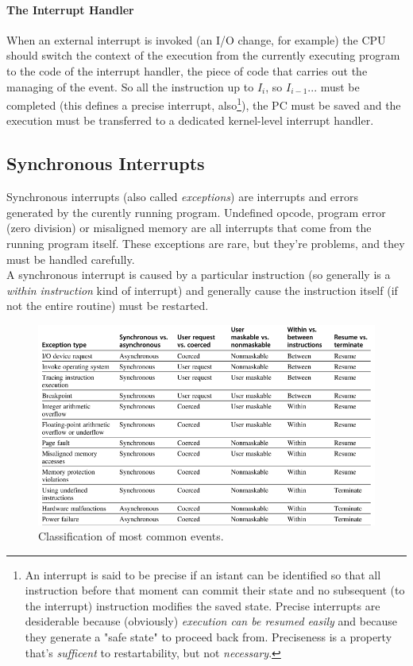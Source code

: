 \documentclass[10pt,a4paper]{article}
\begin{document}
				\paragraph{The Interrupt Handler}
					When an external interrupt is invoked (an I/O change, for example) the CPU should switch the context of the execution from the currently executing program to the code of the interrupt handler, the piece of code that carries out the managing of the event. So all the instruction up to $I_i$, so $I_{i-1}...$ must be completed (this defines a precise interrupt, also\footnote{An interrupt is said to be precise if an istant can be identified so that all instruction before that moment can commit their state and no subsequent (to the interrupt) instruction modifies the saved state. Precise interrupts are desiderable because (obviously) \emph{execution can be resumed easily} and because they generate a "safe state" to proceed back from. Preciseness is a property that's \emph{sufficent} to restartability, but not \emph{necessary}.}), the PC must be saved and the execution must be transferred to a dedicated kernel-level interrupt handler.
				
			\subsection{Synchronous Interrupts}
				Synchronous interrupts (also called \emph{exceptions}) are interrupts and errors generated by the curently running program. Undefined opcode, program error (zero division) or misaligned memory are all interrupts that come from the running program itself. These exceptions are rare, but they're problems, and they must be handled carefully.\\
				A synchronous interrupt is caused by a particular instruction (so generally is a \emph{within instruction} kind of interrupt) and generally cause the instruction itself (if not the entire routine) must be restarted. 
				\begin{figure}[H]
					\centering
					\includegraphics[width = \textwidth]{./images/Exceptions.png}
					\caption{Classification of most common events.}
				\end{figure}
\end{document}

